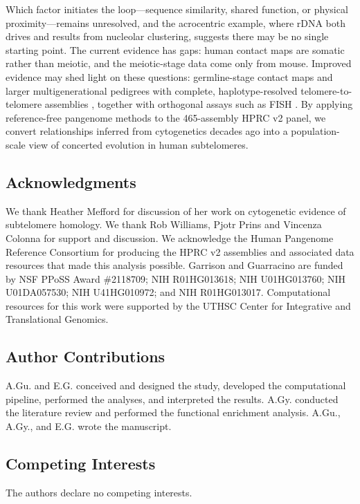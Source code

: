 \documentclass[pdflatex,mathphys]{jnl}
\begin{document}
Which factor initiates the loop---sequence similarity, shared function, or physical proximity---remains unresolved, and the acrocentric example, where rDNA both drives and results from nucleolar clustering, suggests there may be no single starting point. The current evidence has gaps: human contact maps are somatic rather than meiotic, and the meiotic-stage data come only from mouse. Improved evidence may shed light on these questions: germline-stage contact maps and larger multigenerational pedigrees with complete, haplotype-resolved telomere-to-telomere assemblies \cite{Cechova2025}, together with orthogonal assays such as FISH \cite{Trask1991}. By applying reference-free pangenome methods to the 465-assembly HPRC v2 panel, we convert relationships inferred from cytogenetics decades ago into a population-scale view of concerted evolution in human subtelomeres.

\subsection*{Acknowledgments}

We thank Heather Mefford for discussion of her work on cytogenetic evidence of
subtelomere homology. We thank Rob Williams, Pjotr Prins and Vincenza Colonna
for support and discussion.
We acknowledge the Human Pangenome Reference Consortium for producing the HPRC
v2 assemblies and associated data resources that made this analysis possible.
Garrison and Guarracino are
funded by NSF PPoSS Award \#2118709; NIH R01HG013618; NIH U01HG013760; NIH
U01DA057530; NIH U41HG010972; and NIH R01HG013017. Computational resources for
this work were supported by the UTHSC Center for Integrative and Translational
Genomics.

\subsection*{Author Contributions}

A.Gu. and E.G. conceived and designed the study, developed the computational
pipeline, performed the analyses, and interpreted the results. A.Gy.
conducted the literature review and performed the functional enrichment
analysis. A.Gu., A.Gy., and E.G. wrote the manuscript.

\subsection*{Competing Interests}

The authors declare no competing interests.
\end{document}
